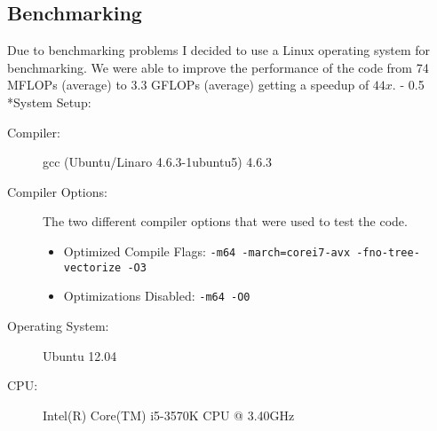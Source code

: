 \documentclass[portrait,a4paper]{article}
\makeatletter
\renewcommand\paragraph{\@startsection{paragraph}{4}{0mm}%
    {-\baselineskip}%
    {0.5\baselineskip}%
    {\normalfont\bfseries}%
}%
\makeatother
\begin{document}
\subsection{Benchmarking}
Due to benchmarking problems I decided to use a Linux operating system for benchmarking.
We were able to improve the performance of the code from 74 MFLOPs (average) to 3.3 GFLOPs (average) getting a speedup of $44x$. 
\paragraph*{System Setup:}
\begin{description}
    \item[Compiler:] gcc (Ubuntu/Linaro 4.6.3-1ubuntu5) 4.6.3
    \item[Compiler Options:] The two different compiler options that were used to test the code.
        \begin{itemize}
            \item Optimized Compile Flags: \lstinline{-m64 -march=corei7-avx -fno-tree-vectorize -O3}
            \item Optimizations Disabled: \lstinline{-m64 -O0}     
        \end{itemize}
    \item[Operating System:] Ubuntu 12.04
    \item[CPU:] Intel(R) Core(TM) i5-3570K CPU @ 3.40GHz
\end{description}
%
%
%
%

%
%
%
%
\end{document}
